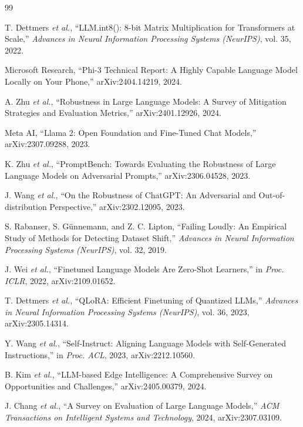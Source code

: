 \documentclass[conference]{IEEEtran}
\begin{document}
\begin{thebibliography}{99}

 T. Dettmers \textit{et al.}, ``LLM.int8(): 8-bit Matrix Multiplication for Transformers at Scale,'' \textit{Advances in Neural Information Processing Systems (NeurIPS)}, vol. 35, 2022.

 Microsoft Research, ``Phi-3 Technical Report: A Highly Capable Language Model Locally on Your Phone,'' arXiv:2404.14219, 2024.

 A. Zhu \textit{et al.}, ``Robustness in Large Language Models: A Survey of Mitigation Strategies and Evaluation Metrics,'' arXiv:2401.12926, 2024.

 Meta AI, ``Llama 2: Open Foundation and Fine-Tuned Chat Models,'' arXiv:2307.09288, 2023.

 K. Zhu \textit{et al.}, ``PromptBench: Towards Evaluating the Robustness of Large Language Models on Adversarial Prompts,'' arXiv:2306.04528, 2023.

 J. Wang \textit{et al.}, ``On the Robustness of ChatGPT: An Adversarial and Out-of-distribution Perspective,'' arXiv:2302.12095, 2023.

 S. Rabanser, S. Günnemann, and Z. C. Lipton, ``Failing Loudly: An Empirical Study of Methods for Detecting Dataset Shift,'' \textit{Advances in Neural Information Processing Systems (NeurIPS)}, vol. 32, 2019.

 J. Wei \textit{et al.}, ``Finetuned Language Models Are Zero-Shot Learners,'' in \textit{Proc. ICLR}, 2022, arXiv:2109.01652.

 T. Dettmers \textit{et al.}, ``QLoRA: Efficient Finetuning of Quantized LLMs,'' \textit{Advances in Neural Information Processing Systems (NeurIPS)}, vol. 36, 2023, arXiv:2305.14314.

 Y. Wang \textit{et al.}, ``Self-Instruct: Aligning Language Models with Self-Generated Instructions,'' in \textit{Proc. ACL}, 2023, arXiv:2212.10560.

 B. Kim \textit{et al.}, ``LLM-based Edge Intelligence: A Comprehensive Survey on Opportunities and Challenges,'' arXiv:2405.00379, 2024.

 J. Chang \textit{et al.}, ``A Survey on Evaluation of Large Language Models,'' \textit{ACM Transactions on Intelligent Systems and Technology}, 2024, arXiv:2307.03109.


\end{thebibliography}
\end{document}
